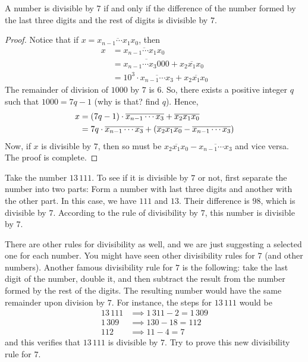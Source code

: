 \begin{proposition}[Divisibility by $7$]\label{prop:divisibility-7}
A number is divisible by $7$ if and only if the difference of the number formed by the last three digits and the rest of digits is divisible by $7$.
\end{proposition}

\begin{proof}
Notice that if $x = \overline{x_{n-1} \cdots x_1 x_0 }$, then
	\begin{align*}
		x &= \overline{x_{n-1} \cdots x_1 x_0 }\\
  &= \overline{x_{n-1} \cdots x_3 000 } +  \overline{x_{2} x_1 x_0 }\\
  &= 10^3 \cdot \overline{x_{n-1} \cdots x_3} +  \overline{x_{2} x_1 x_0 }
	\end{align*}
The remainder of division of $1000$ by $7$ is $6$. So, there exists a positive integer $q$ such that $1000 = 7q - 1$ (why is that? find $q$). Hence,
	\begin{align*}
		x &= (7q-1) \cdot \overline{x_{n-1} \cdots x_3} +  \overline{x_{2} x_1 x_0 }\\
  &= 7q \cdot \overline{x_{n-1} \cdots x_3} + \left(\overline{x_{2} x_1 x_0 } - \overline{x_{n-1} \cdots x_3}\right)
	\end{align*}
Now, if $x$ is divisible by $7$, then so must be $\overline{x_{2} x_1 x_0 } - \overline{x_{n-1} \cdots x_3}$ and vice versa. The proof is complete.
\end{proof}


\begin{example}
Take the number $13\, 111$. To see if it is divisible by $7$ or not, first separate the number into two parts: Form a number with last three digits and another with the other part. In this case, we have $111$ and $13$. Their difference is $98$, which is divisible by $7$. According to the rule of divisibility by $7$, this number is divisible by $7$.
\end{example}

There are other rules for divisibility as well, and we are just suggesting a selected one for each number. You might have seen other divisibility rules for $7$ (and other numbers). Another famous divisibility rule for $7$ is the following: take the last digit of the number, double it, and then subtract the result from the number formed by the rest of the digits. The resulting number would have the same remainder upon division by $7$. For instance, the steps for $13\, 111$ would be
\begin{align*}
	13\, 111 & \implies 1\,311 - 2 = 1\, 309\\
	1\, 309  & \implies 130 - 18 = 112\\
	112 &\implies 11 - 4 = 7
\end{align*}
and this verifies that $13\, 111$ is divisible by $7$. Try to prove this new divisibility rule for $7$.

